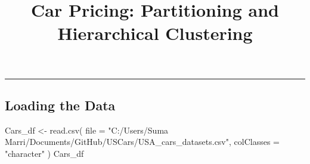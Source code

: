 \documentclass[
]{article}
\title{Car Pricing: Partitioning and Hierarchical Clustering}
\author{}
\date{\vspace{-2.5em}}
\newenvironment{Shaded}{\begin{snugshade}}{\end{snugshade}}
\newcommand{\AttributeTok}[1]{\textcolor[rgb]{0.77,0.63,0.00}{#1}}
\newcommand{\FunctionTok}[1]{\textcolor[rgb]{0.00,0.00,0.00}{#1}}
\newcommand{\NormalTok}[1]{#1}
\newcommand{\OtherTok}[1]{\textcolor[rgb]{0.56,0.35,0.01}{#1}}
\newcommand{\StringTok}[1]{\textcolor[rgb]{0.31,0.60,0.02}{#1}}
\begin{document}
\maketitle

\begin{center}\rule{0.5\linewidth}{0.5pt}\end{center}

\hypertarget{loading-the-data}{%
\subsection{Loading the Data}\label{loading-the-data}}

\begin{Shaded}
\begin{Highlighting}[]
\NormalTok{Cars\_df }\OtherTok{\textless{}{-}} \FunctionTok{read.csv}\NormalTok{(}
  \AttributeTok{file =} \StringTok{"C:/Users/Suma Marri/Documents/GitHub/USCars/USA\_cars\_datasets.csv"}\NormalTok{,}
  \AttributeTok{colClasses =} \StringTok{"character"}
\NormalTok{  )}
\NormalTok{Cars\_df}
\end{Highlighting}
\end{Shaded}
\end{document}
